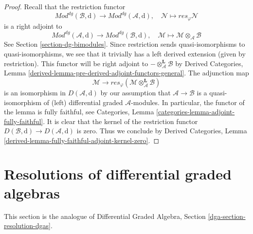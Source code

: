 \begin{proof}
Recall that the restriction functor
$$
\textit{Mod}^{dg}(\mathcal{B}, \text{d}) \to
\textit{Mod}^{dg}(\mathcal{A}, \text{d}),\quad
\mathcal{N} \mapsto res_\varphi \mathcal{N}
$$
is a right adjoint to
$$
\textit{Mod}^{dg}(\mathcal{A}, \text{d}) \to
\textit{Mod}^{dg}(\mathcal{B}, \text{d}),\quad
\mathcal{M} \mapsto \mathcal{M} \otimes_\mathcal{A} \mathcal{B}
$$
See Section \ref{section-dg-bimodules}. Since restriction
sends quasi-isomorphisms to quasi-isomorphisms, we see that
it trivially has a left derived extension (given by
restriction). This functor will be right adjoint to
$- \otimes_\mathcal{A}^\mathbf{L} \mathcal{B}$ by
Derived Categories, Lemma
\ref{derived-lemma-pre-derived-adjoint-functors-general}.
The adjunction map
$$
\mathcal{M} \to
res_\varphi(\mathcal{M} \otimes_\mathcal{A}^\mathbf{L} \mathcal{B})
$$
is an isomorphism in $D(\mathcal{A}, \text{d})$ by our assumption
that $\mathcal{A} \to \mathcal{B}$ is a quasi-isomorphism of
(left) differential graded $\mathcal{A}$-modules. In particular,
the functor of the lemma is fully faithful, see
Categories, Lemma \ref{categories-lemma-adjoint-fully-faithful}.
It is clear that the kernel of the restriction functor
$D(\mathcal{B}, \text{d}) \to D(\mathcal{A}, \text{d})$
is zero. Thus we conclude by Derived Categories, Lemma
\ref{derived-lemma-fully-faithful-adjoint-kernel-zero}.
\end{proof}













\section{Resolutions of differential graded algebras}
\label{section-resolution-dgas}

\noindent
This section is the analogue of
Differential Graded Algebra, Section \ref{dga-section-resolution-dgas}.


